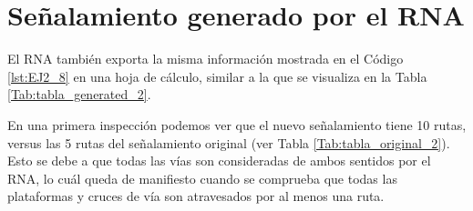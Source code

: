 \section{Señalamiento generado por el RNA}

	El RNA también exporta la misma información mostrada en el Código \ref{lst:EJ2_8} en una hoja de cálculo, similar a la que se visualiza en la Tabla \ref{Tab:tabla_generated_2}.   
    
    \begin{table}[H]
        {
        \caption{Tabla de enclavamiento del ejemplo 2 generada por el RNA.}
        \label{Tab:tabla_generated_2}
        \begin{center}
        \end{center}
     }
    \end{table}
    
    En una primera inspección podemos ver que el nuevo señalamiento tiene 10 rutas, versus las 5 rutas del señalamiento original (ver Tabla \ref{Tab:tabla_original_2}). Esto se debe a que todas las vías son consideradas de ambos sentidos por el RNA, lo cuál queda de manifiesto cuando se comprueba que todas las plataformas y cruces de vía son atravesados por al menos una ruta. 